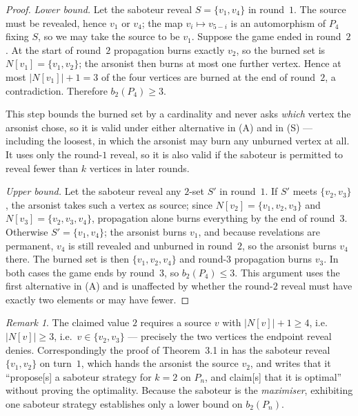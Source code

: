 \documentclass[11pt]{amsart}
\theoremstyle{remark}
\newtheorem*{remark}{Remark}
\begin{document}
\begin{proof}
\emph{Lower bound.} Let the saboteur reveal $S=\{v_1,v_4\}$ in round~$1$. The
source must be revealed, hence $v_1$ or $v_4$; the map $v_i\mapsto v_{5-i}$ is
an automorphism of $P_4$ fixing $S$, so we may take the source to be $v_1$.
Suppose the game ended in round~$2$. At the start of round~$2$ propagation
burns exactly $v_2$, so the burned set is $N[v_1]=\{v_1,v_2\}$; the arsonist
then burns at most one further vertex. Hence at most
$|N[v_1]|+1=3$ of the four vertices are burned at the end of round~$2$, a
contradiction. Therefore $b_2(P_4)\ge3$.

This step bounds the burned set by a cardinality and never asks \emph{which}
vertex the arsonist chose, so it is valid under either alternative in (A) and in
(S) --- including the loosest, in which the arsonist may burn any unburned
vertex at all. It uses only the round-$1$ reveal, so it is also valid if the
saboteur is permitted to reveal fewer than $k$ vertices in later rounds.

\emph{Upper bound.} Let the saboteur reveal any $2$-set $S'$ in round~$1$.
If $S'$ meets $\{v_2,v_3\}$, the arsonist takes such a vertex as source; since
$N[v_2]=\{v_1,v_2,v_3\}$ and $N[v_3]=\{v_2,v_3,v_4\}$, propagation alone burns
everything by the end of round~$3$. Otherwise $S'=\{v_1,v_4\}$; the arsonist
burns $v_1$, and because revelations are permanent, $v_4$ is still revealed and
unburned in round~$2$, so the arsonist burns $v_4$ there. The burned set is
then $\{v_1,v_2,v_4\}$ and round-$3$ propagation burns $v_3$. In both cases the
game ends by round~$3$, so $b_2(P_4)\le3$. This argument uses the first
alternative in (A) and is unaffected by whether the round-$2$ reveal must have
exactly two elements or may have fewer.
\end{proof}

\begin{remark}
The claimed value $2$ requires a source $v$ with $|N[v]|+1\ge4$, i.e.\
$|N[v]|\ge3$, i.e.\ $v\in\{v_2,v_3\}$ --- precisely the two vertices the
endpoint reveal denies. Correspondingly the proof of Theorem~3.1 in
\cite{Target} has the saboteur reveal $\{v_1,v_2\}$ on turn~$1$, which hands
the arsonist the source $v_2$, and writes that it ``propose[s] a saboteur
strategy for $k=2$ on $P_n$, and claim[s] that it is optimal'' without proving
the optimality. Because the saboteur is the \emph{maximiser}, exhibiting one
saboteur strategy establishes only a lower bound on $b_2(P_n)$.
\end{remark}
\end{document}
